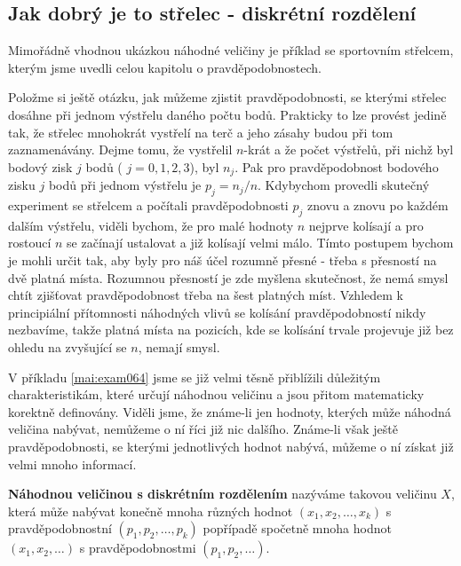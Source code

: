     \subsection{Jak dobrý je to střelec - diskrétní rozdělení}
      Mimořádně vhodnou ukázkou náhodné veličiny je příklad se sportovním střelcem, kterým jsme
      uvedli celou kapitolu o pravděpodobnostech.
  
      
    
    Položme si ještě otázku, jak můžeme zjistit pravděpodobnosti, se kterými střelec dosáhne při
    jednom výstřelu daného počtu bodů. Prakticky to lze provést jedině tak, že střelec mnohokrát
    vystřelí na terč a jeho zásahy budou při tom zaznamenávány. Dejme tomu, že vystřelil \(n\)-krát 
    a že počet výstřelů, při nichž byl bodový zisk \(j\) bodů ( \(j = 0, 1, 2, 3\)), byl \(n_j\). 
    Pak pro pravděpodobnost bodového zisku \(j\) bodů při jednom výstřelu je \(p_j = n_j/n\). 
    Kdybychom provedli skutečný experiment se střelcem a počítali pravděpodobnosti \(p_j\) znovu a 
    znovu po každém dalším výstřelu, viděli bychom, že pro malé hodnoty \(n\) nejprve kolísají a 
    pro rostoucí \(n\) se začínají ustalovat a již kolísají velmi málo. Tímto postupem bychom je 
    mohli určit tak, aby byly pro náš účel rozumně přesné - třeba s přesností na dvě platná místa. 
    Rozumnou přesností je zde myšlena skutečnost, že nemá smysl chtít zjišťovat pravděpodobnost 
    třeba na šest platných míst. Vzhledem k principiální přítomnosti náhodných vlivů se kolísání 
    pravděpodobností nikdy nezbavíme, takže platná místa na pozicích, kde se kolísání trvale 
    projevuje již bez ohledu na zvyšující se \(n\), nemají smysl.
    
    V příkladu \ref{mai:exam064} jsme se již velmi těsně přiblížili důležitým charakteristikám, 
    které určují náhodnou veličinu a jsou přitom matematicky korektně definovány. Viděli jsme, že 
    známe-li jen hodnoty, kterých může náhodná veličina nabývat, nemůžeme o ní říci již nic 
    dalšího. Známe-li však ještě pravděpodobnosti, se kterými jednotlivých hodnot nabývá, můžeme o 
    ní získat již velmi mnoho informací.

    \begin{mdframed}[style=highlight]
      \textbf{Náhodnou veličinou s diskrétním rozdělením} nazýváme takovou veličinu \(X\), která
      může nabývat konečně mnoha různých hodnot \((x_1, x_2, \ldots, x_k)\) s pravděpodobnostní
      \((p_1, p_2, \ldots, p_k)\) popřípadě spočetně mnoha hodnot \((x_1, x_2, \ldots)\) s 
      pravděpodobnostmi \((p_1, p_2, \ldots)\).
    \end{mdframed}

